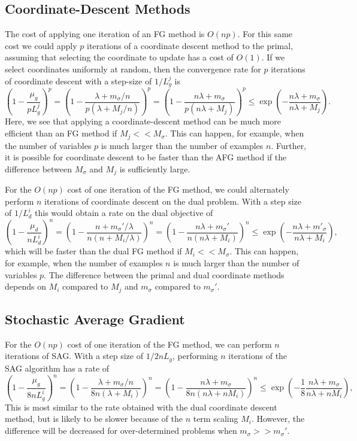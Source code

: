 \documentclass{article}
\begin{document}
\subsection{Coordinate-Descent Methods}

The cost of applying one iteration of an FG method is $O(np)$. For this same cost we could apply $p$ iterations of a coordinate descent method to the primal, assuming that selecting the coordinate to update has a cost of $O(1)$. If we select coordinates uniformly at random, then the convergence rate for $p$ iterations of coordinate descent with a step-size of $1/L_g^j$ is~\cite[Theorem 2]{nesterov2010efficiency}
\[
\left(1-\frac{\mu_g}{pL_g^j}\right)^p
= \left(1-\frac{\lambda + m_\sigma/n}{p(\lambda + M_j/n)}\right)^p
= \left(1-\frac{n\lambda + m_\sigma}{p(n\lambda + M_j)}\right)^p
\leq \exp\left(-\frac{n\lambda + m_\sigma}{n\lambda + M_j}\right).
\]
Here, we see that applying a coordinate-descent method can be much more efficient than an FG method if $M_j << M_\sigma$. This can happen, for example, when the number of variables $p$ is much larger than the number of examples $n$. Further, it is possible for coordinate descent to be faster than the AFG method if the difference between $M_\sigma$ and $M_j$ is sufficiently large.

For the $O(np)$ cost of one iteration of the FG method, we could alternately perform $n$ iterations of coordinate descent on the dual problem. With a step size of $1/L_d^i$ this would obtain a rate on the dual objective of
\[
\left(1-\frac{\mu_d}{nL_d^i}\right)^n
= \left(1-\frac{n + m_\sigma'/\lambda}{n(n + M_i/\lambda)}\right)^n
= \left(1-\frac{n\lambda + m_\sigma'}{n(n\lambda + M_i)}\right)^n
\leq \exp\left(-\frac{n\lambda + m'_\sigma}{n\lambda + M_i}\right),
\]
which will be faster than the dual FG method if $M_i << M_\sigma$. This can happen, for example, when the number of examples $n$ is much larger than the number of variables $p$. The difference between the primal and dual coordinate methods depends on $M_i$ compared to $M_j$ and $m_\sigma$ compared to $m_\sigma'$.


\subsection{Stochastic Average Gradient}

For the $O(np)$ cost of one iteration of the FG method, we can perform $n$ iterations of SAG. With a step size of $1/2nL_g$, performing $n$ iterations of the SAG algorithm has a rate of
\[
\left(1 - \frac{\mu_g}{8nL_g^i}\right)^n
= \left(1 - \frac{\lambda + m_\sigma/n}{8n(\lambda + M_i)}\right)^n
= \left(1 - \frac{n\lambda + m_\sigma}{8n(n\lambda + nM_i)}\right)^n
\leq \exp\left(-\frac{1}{8}\frac{n\lambda + m_\sigma}{n\lambda + nM_i}\right),
\]
This is most similar to the rate obtained with the dual coordinate descent method, but is likely to be slower because of the $n$ term scaling $M_i$. However, the difference will be decreased for over-determined problems when $m_\sigma >> m_\sigma'$.
\end{document}

